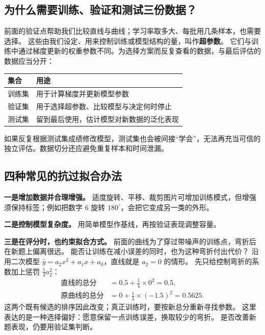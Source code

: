 \subsection{为什么需要训练、验证和测试三份数据？}
\label{concept:training-set}
\label{concept:validation-set}
\label{concept:test-set}

前面的验证点帮助我们比较直线与曲线；学习率取多大、每批用几条样本，也需要选择。
\label{concept:hyperparameter}%
这些由我们设定、用来控制训练或模型结构的量，叫作\textbf{超参数}。
它们与训练中通过梯度更新的权重参数不同。为选择方案而反复查看的数据，与最后评估的数据应当分开：

\begin{center}
\small
{}
\begin{tabularx}{\linewidth}{@{}p{21mm}X@{}}\toprule
集合 & 用途\\\midrule
训练集 & 用于计算梯度并更新模型参数\\
验证集 & 用于选择超参数、比较模型与决定何时停止\\
测试集 & 留到最后使用，估计模型对新数据的泛化表现\\
\bottomrule\end{tabularx}
\end{center}
如果反复根据测试集成绩修改模型，测试集也会被间接“学会”，无法再充当可信的独立评估。数据切分还应避免重复样本和时间泄漏。

\subsection{四种常见的抗过拟合办法}
\label{concept:data-augmentation}
\label{concept:regularization}
\label{concept:early-stopping}

\textbf{一是增加数据并合理增强。}
适度旋转、平移、裁剪图片可增加训练模式，但增强须保持标签；例如把数字 $6$ 旋转 $180^\circ$，会把它变成另一类的外形。

\textbf{二是控制模型复杂度。}
用简单模型作基线，再按验证表现调整容量。

\textbf{三是在评分时，也约束拟合方式。}
前面的曲线为了穿过带噪声的训练点，弯折后在新题上偏离很远。
能否让训练在减小误差的同时，也为这种弯折付出代价？
沿用二次模型 $\widehat{y}=a_2x^2+a_1x+a_0$，直线就是 $a_2=0$ 的情形。
先只给控制弯折的系数加上惩罚 $\tfrac14a_2^2$：
\[
\begin{aligned}
\text{直线的总分}&=0.5+\tfrac14\times0^2=0.5,\\
\text{原曲线的总分}&=0+\tfrac14\times(-1.5)^2=0.5625.
\end{aligned}
\]
这两个既有候选的排序因此改变；真正训练时，要按新总分重新寻找参数。
这里表达的是一种选择偏好：愿意保留一点训练误差，换取较少的弯折。
是否改善新题表现，仍要用验证集判断。

